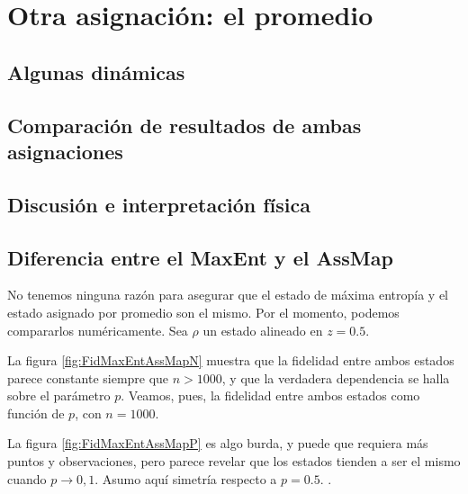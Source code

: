 \chapter{Otra asignación: el promedio}

\section{Algunas dinámicas}

\section{Comparación de resultados de ambas asignaciones}

\section{Discusión e interpretación física}

\section{Diferencia entre el MaxEnt y el AssMap}
No tenemos ninguna razón para asegurar que el estado de máxima entropía y el estado asignado por promedio son el mismo. Por el momento, podemos compararlos numéricamente. Sea $\rho$ un estado alineado en $z=0.5$. 



La figura \ref{fig:FidMaxEntAssMapN} muestra que la fidelidad entre ambos estados parece constante siempre que $n>1000$, y que la verdadera dependencia se halla sobre el parámetro $p$. Veamos, pues, la fidelidad entre ambos estados como función de $p$, con $n=1000$.



La figura \ref{fig:FidMaxEntAssMapP} es algo burda, y puede que requiera más puntos y observaciones, pero parece revelar que los estados tienden a ser el mismo cuando $p\rightarrow 0,1$. Asumo aquí simetría respecto a $p=0.5$. .